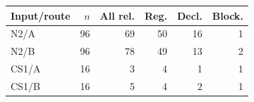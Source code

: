\begin{tabular}{lrrrrr}
\toprule
Input/route & $n$ & All rel. & Reg. & Decl. & Block. \\
\midrule
N2/A & 96 & 69 & 50 & 16 & 1 \\
N2/B & 96 & 78 & 49 & 13 & 2 \\
CS1/A & 16 & 3 & 4 & 1 & 1 \\
CS1/B & 16 & 5 & 4 & 2 & 1 \\
\bottomrule
\end{tabular}
